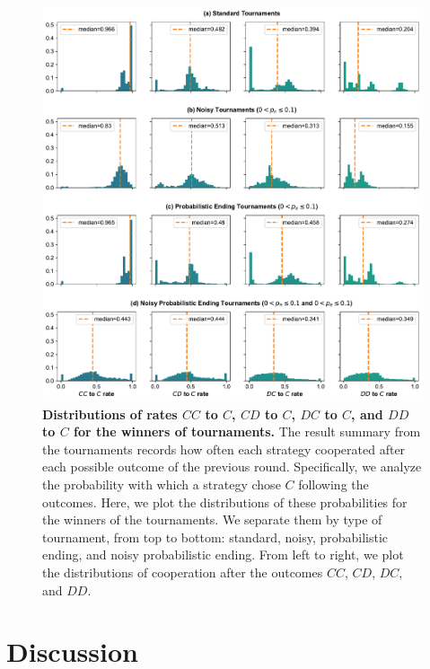 \documentclass{article}
\begin{document}
\begin{figure}[!htbp]
    \centering
        \centering
        \includegraphics[width=\textwidth]{../images/rates_result.pdf}
        \caption{\textbf{Distributions of rates \(CC\) to \(C\), \(CD\) to \(C\), \(DC\)
        to \(C\), and \(DD\) to \(C\) for the winners of tournaments.} The result
        summary from the tournaments records how often each strategy cooperated after
        each possible outcome of the previous round. Specifically, we analyze the
        probability with which a strategy chose \(C\) following the outcomes. Here, we
        plot the distributions of these probabilities for the winners of the
        tournaments. We separate them by type of tournament, from top to bottom:
        standard, noisy, probabilistic ending, and noisy probabilistic ending. From left
        to right, we plot the distributions of cooperation after the outcomes \(CC\),
        \(CD\), \(DC\), and \(DD\).}\label{fig:discussion_rates}
\end{figure}


\section{Discussion}\label{section:conclusion}
\end{document}

